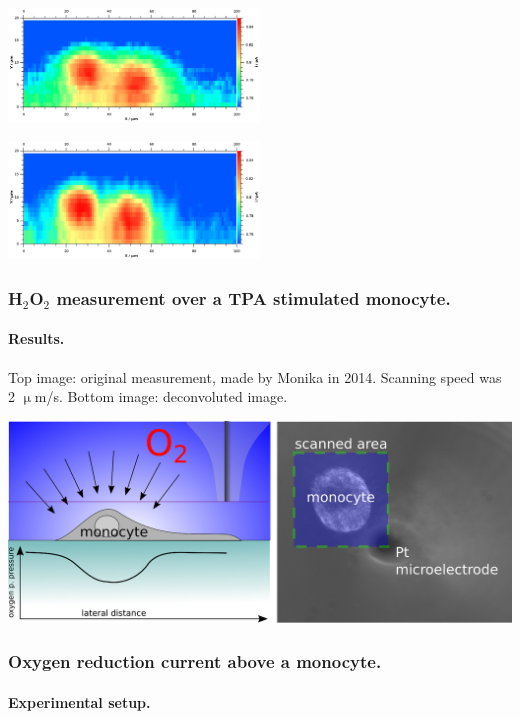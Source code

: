 \documentclass{beamer}
\begin{document}
\begin{frame}
        \centering
        \includegraphics[width=0.5\textwidth]{original.eps}
	
	\includegraphics[width=0.5\textwidth]{deconvoluted.eps}


\frametitle{H$_2$O$_2$ measurement over a TPA stimulated monocyte.}
        \framesubtitle{Results.}

\vfill
Top image: original measurement, made by Monika in 2014. Scanning speed was 2 $\upmu$m/s. Bottom image: deconvoluted image.
\end{frame}


\begin{frame}
        \centering
        \includegraphics[width=1\textwidth]{oxygen.eps}

\frametitle{Oxygen reduction current above a monocyte.}
\framesubtitle{Experimental setup.}
\end{frame}
\end{document}
